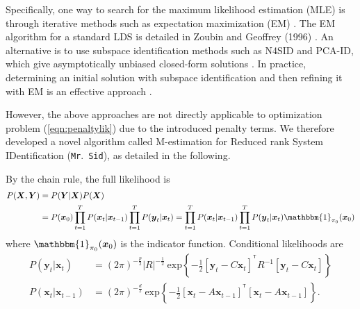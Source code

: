 \documentclass[fleqn,12pt]{article}
\let\oldref\ref
\renewcommand{\ref}[1]{(\oldref{#1})}
\newcommand{\T}{^{\ensuremath{\mathsf{T}}}}           %
\newcommand{\mrsid}{{\sc \texttt{Mr}.~\texttt{Sid}}}
\providecommand{\mb}[1]{\boldsymbol{#1}}
\newcommand{\bx}{\mb{x}}
\newcommand{\by}{\mb{y}}
\newcommand{\bX}{\mb{X}}
\newcommand{\bY}{\mb{Y}}
\begin{document}
Specifically, one way to search for the maximum likelihood estimation (MLE) is through iterative methods such as expectation maximization (EM) \citep{shumway1982approach}. The EM algorithm for a standard LDS is detailed in Zoubin and Geoffrey (1996) \citep{ghahramani1996parameter}. An alternative is to use subspace identification methods such as N4SID and PCA-ID, which give asymptotically unbiased closed-form solutions \citep{van1994n4sid,doretto2003dynamic}. In practice, determining an initial solution with subspace identification and then refining it with EM is an effective approach \citep{bootslearning}.

However, the above approaches are not directly applicable to optimization problem \ref{eqn:penaltylik} due to the introduced penalty terms. We therefore developed a novel algorithm called M-estimation for Reduced rank System IDentification (\mrsid), as detailed in the following.

By the chain rule, the full likelihood is
\begin{equation*}\label{eqn:likelihood}
\begin{aligned}
P(\bX,\bY)&=P(\bY|\bX) P(\bX)\\
&= P(\bx_0)\prod\limits_{t=1}^{T}P(\bx_t|\bx_{t-1})\prod\limits_{t=1}^{T} P(\by_t|\bx_t)=\prod\limits_{t=1}^{T}P(\bx_t|\bx_{t-1})\prod\limits_{t=1}^{T} P(\by_t|\bx_t)\mathbbm{1}_{\mathbf{\pi}_0}(\bx_0)
\end{aligned}
\end{equation*}
where $\mathbbm{1}_{\mathbf{\pi}_0}(\bx_0)$ is the indicator function. Conditional likelihoods are
\begin{equation*}\label{eqn:condlik}
\begin{aligned}
P(\by_t|\bx_t)&= (2\pi)^{-\frac{p}{2}}|R|^{-\frac{1}{2}}\  \text{exp}\left\{-\frac{1}{2}[\by_t-C\bx_t]^{\T}R^{-1}[\by_t-C\bx_t]\right\}\\
P(\bx_t|\bx_{t-1})
&=(2\pi)^{-\frac{d}{2}}\  \text{exp}\left\{-\frac{1}{2}[\bx_t-A\bx_{t-1}]^{\T}[\bx_t-A\bx_{t-1}]\right\}.
\end{aligned}
\end{equation*}
\end{document}
